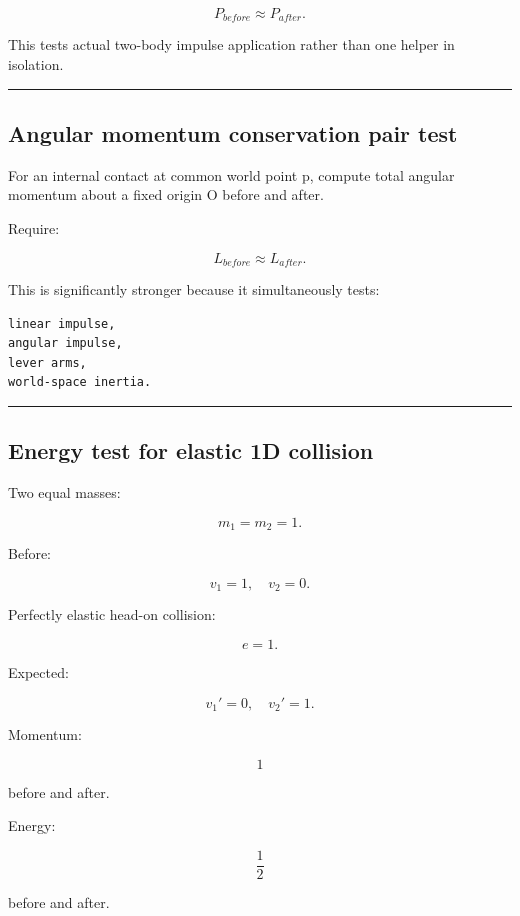\[
\boxed{
P_{before}\approx P_{after}.
}
\]

This tests actual two-body impulse application rather than one helper in isolation.

\begin{center}\rule{0.5\linewidth}{0.5pt}\end{center}

\subsection{Angular momentum conservation pair test}\label{06-engine-ii-ch039-angular-momentum-conservation-pair-test}

For an internal contact at common world point p, compute total angular momentum about a fixed origin O before and after.

Require:

\[
L_{before}\approx L_{after}.
\]

This is significantly stronger because it simultaneously tests:

\begin{verbatim}
linear impulse,
angular impulse,
lever arms,
world-space inertia.
\end{verbatim}

\begin{center}\rule{0.5\linewidth}{0.5pt}\end{center}

\subsection{Energy test for elastic 1D collision}\label{06-engine-ii-ch039-energy-test-for-elastic-1d-collision}

Two equal masses:

\[
m_1=m_2=1.
\]

Before:

\[
v_1=1,\quad v_2=0.
\]

Perfectly elastic head-on collision:

\[
e=1.
\]

Expected:

\[
v_1'=0,
\quad
v_2'=1.
\]

Momentum:

\[
1
\]

before and after.

Energy:

\[
\frac12
\]

before and after.

